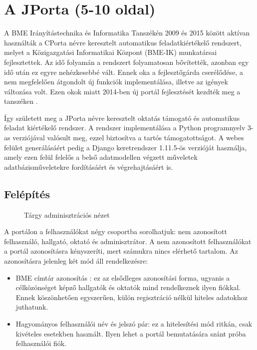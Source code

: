 \chapter{A JPorta (5-10 oldal)}\label{chapter:jporta}

A BME Irányítástechnika és Informatika Tanszékén 2009 és 2015 között aktívan használták a CPorta névre keresztelt automatikus feladatkiértékelő rendszert, melyet a Közigazgatási Informatikai Központ (BME-IK) munkatársai fejlesztettek. Az idő folyamán a rendszert folyamatosan bővítették, azonban egy idő után ez egyre nehézkesebbé vált. Ennek oka a fejlesztőgárda cserélődése, a nem megfelelően átgondolt új funkciók implementálása, illetve az igények változása volt. Ezen okok miatt 2014-ben új portál fejlesztését kezdték meg a tanszéken \cite{KalmanMsc}.

 Így született meg a JPorta névre keresztelt oktatás támogató és automatikus feladat kiértékelő rendszer. A rendszer implementálása a Python programnyelv 3-as verziójával valósult meg, ezzel biztosítva a tartós támogatottságot. A webes felület generálásáért pedig a Django \cite{Django} keretrendszer 1.11.5-ös verzióját használja, amely ezen felül felelős a belső adatmodellen végzett műveletek adatbázisműveletekre fordításáért és végrehajtásáért is. 

 \section{Felépítés}

    \begin{figure}[h]
        \centering
        \caption{Tárgy adminisztrációs nézet}
        \label{fig:jporta_course}
    \end{figure}
     
    A portálon a felhasználókat négy csoportba sorolhatjuk: nem azonosított felhasználó, hallgató, oktató és adminisztrátor. A nem azonosított felhasználókat a portál azonosításra kényszeríti, mert számukra nincs elérhető tartalom. Az azonosításra jelenleg két mód áll rendelkezésre:
    \begin{itemize}
        \item BME címtár azonosítás \cite{BMECimtar}: ez az elsődleges azonosítási forma, ugyanis a célközönséget képző hallgatók és oktatók mind rendelkeznek ilyen fiókkal. Ennek köszönhetően egyszerűen, külön regisztráció nélkül hiteles adatokhoz juthatunk.
        \item Hagyományos felhasználói név és jelszó pár: ez a hitelesítési mód ritkán, csak kivételes esetekben használt. Ilyen lehet a portál bemutatására szánt próba felhasználói fiók.
    \end{itemize}

